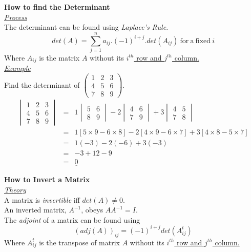 \documentclass[11pt,a4paper]{article}
\begin{document}
\textbf{How to find the Determinant}\\

\underline{\textit{Process}}\\
The determinant can be found using \textit{Laplace's Rule}.
$$det(A) = \sum_{j=1}^n a_{ij}.(-1)^{i+j}.det(A_{ij}) \mathrm{\ for\ a\ fixed\ }i$$
Where $A_{ij}$ is the matrix $A$ without its \underline{$i^{th}$ row and $j^{th}$ column.}\\

\underline{\textit{Example}}\\
Find the determinant of $\begin{pmatrix} 1 & 2 & 3 \\ 4 & 5 & 6 \\ 7 & 8 & 9 \end{pmatrix}$.
\[\begin{array}{ccl}
  \begin{vmatrix} 1 & 2 & 3 \\ 4 & 5 & 6 \\ 7 & 8 & 9 \end{vmatrix} &=& 1\begin{vmatrix} 5 & 6 \\ 8 & 9 \end{vmatrix} - 2\begin{vmatrix} 4 & 6 \\ 7 & 9 \end{vmatrix} + 3\begin{vmatrix} 4 & 5 \\ 7 & 8 \end{vmatrix}\\
    &=& 1[5 \times 9 - 6 \times 8] - 2[4 \times 9 - 6 \times 7] + 3[4 \times 8 - 5 \times 7] \\
    &=& 1(-3) -2(-6) + 3(-3) \\
    &=& -3 + 12 - 9\\
    &=& \underline{0}
\end{array}\]

\textbf{How to Invert a Matrix}\\

\underline{\textit{Theory}}\\
A matrix is \textit{invertible} iff $det(A) \neq 0$.\\
An inverted matrix, $A^{-1}$, obeys $AA^{-1} = I$.\\
The \textit{adjoint} of a matrix can be found using
$$(adj(A))_{ij} = (-1)^{i+j}det(A^t_{ij})$$
Where $A^t_{ij}$ is the transpose of matrix $A$ without its \underline{$i^{th}$ row and $j^{th}$ column.}\\
\end{document}
